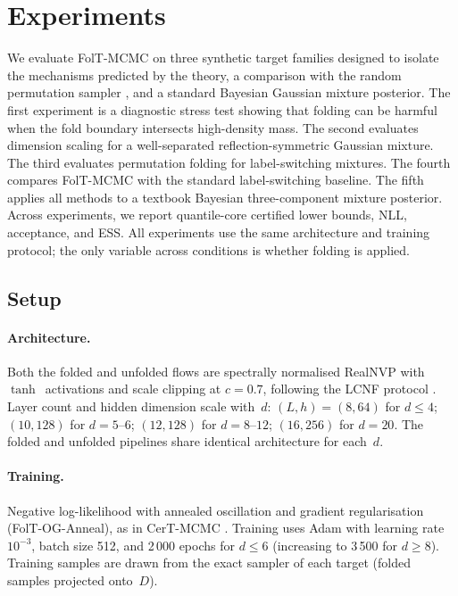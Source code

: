 %  

\section{Experiments}
\label{sec:experiments}

We evaluate FolT-MCMC on three synthetic target families designed to
isolate the mechanisms predicted by the theory, a comparison with
the random permutation sampler \citep{FruhwirthSchnatter2001},
and a standard Bayesian Gaussian mixture posterior.  The first
experiment is a diagnostic stress test showing that folding can be
harmful when the fold boundary intersects high-density mass.  The
second evaluates dimension scaling for a well-separated
reflection-symmetric Gaussian mixture.  The third evaluates
permutation folding for label-switching mixtures.  The fourth
compares FolT-MCMC with the standard label-switching baseline.  The
fifth applies all methods to a textbook Bayesian three-component
mixture posterior.  Across experiments, we report quantile-core
certified lower bounds, NLL, acceptance, and ESS.
All experiments use the same architecture and training protocol;
the only variable across conditions is whether folding is applied.


\subsection{Setup}
\label{sec:exp_setup}

\paragraph{Architecture.}
Both the folded and unfolded flows are spectrally normalised
RealNVP \citep{DinhSohlDickstein2017,Miyato2018} with
$\tanh$~activations and scale clipping at $c = 0.7$, following
the LCNF protocol \citep{LCNF}.  Layer count and hidden dimension
scale with~$d$: $(L, h) = (8, 64)$ for $d \leq 4$;
$(10, 128)$ for $d = 5$--$6$; $(12, 128)$ for $d = 8$--$12$;
$(16, 256)$ for $d = 20$.  The folded and unfolded pipelines share
identical architecture for each~$d$.

\paragraph{Training.}
Negative log-likelihood with annealed oscillation and gradient
regularisation (FolT-OG-Anneal), as in CerT-MCMC \citep{CerTMCMC}.
Training uses Adam with learning rate $10^{-3}$, batch size 512,
and 2\,000 epochs for $d \leq 6$ (increasing to 3\,500 for
$d \geq 8$).  Training samples are drawn from the exact sampler
of each target (folded samples projected onto~$D$).

